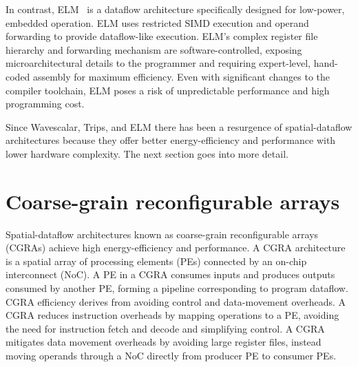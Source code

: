 In contrast, ELM~\cite{balfour2008energy} is a dataflow architecture specifically designed for low-power, embedded operation. 
% 
ELM uses
restricted SIMD execution and operand forwarding to provide
dataflow-like execution.
% 
ELM's complex register file hierarchy and forwarding
mechanism are software-controlled, exposing microarchitectural details to the
programmer and requiring expert-level, hand-coded assembly for maximum
efficiency.
% 
Even with significant changes to the compiler toolchain, ELM poses
a risk of unpredictable performance and high programming cost. 

Since Wavescalar, Trips, and ELM there has been a resurgence of spatial-dataflow architectures because they offer better energy-efficiency and performance with lower hardware complexity.
% 
The next section goes into more detail.

\section{Coarse-grain reconfigurable arrays}
Spatial-dataflow architectures known as coarse-grain reconfigurable arrays (CGRAs) achieve high energy-efficiency and performance.
% 
A CGRA architecture~\cite{remarc,adres,matrix,dyser,revamp,opencgra,cgrame,wave,nguyen2021fifer,morphosys,mozart,ppa,fpca,plasticine,dadu2019towards,parashar2013triggered,capstan,nowatzki:isca17:stream-dataflow,goldstein2000piperench,weng2020dsagen,weng2020hybrid,voitsechov2014single,mishra2006tartan,tan2018stitch,karunaratne2017hycube,voitsechov2018inter,evx} is a spatial array of
processing elements (PEs) connected by an on-chip interconnect (NoC).
%
A PE in a CGRA consumes inputs and produces outputs 
consumed by another PE, forming a pipeline corresponding to 
program dataflow.
%
CGRA efficiency derives from avoiding control and data-movement overheads.
%
A CGRA reduces instruction overheads by mapping operations to a PE,
avoiding the need for instruction fetch and decode and simplifying control.
%
A CGRA mitigates data movement overheads by avoiding large register
files, instead moving operands through a NoC directly from 
producer PE to consumer PEs.

